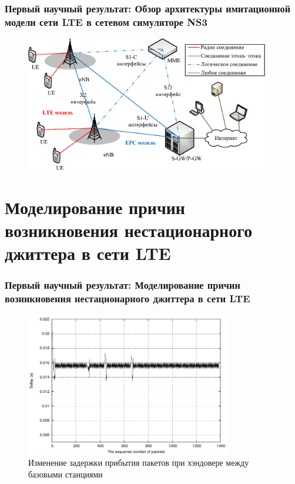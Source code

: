 \documentclass[10pt,pdf,hyperref={unicode}]{beamer}
\begin{document}
\begin{frame}
\frametitle{Первый научный результат: Обзор архитектуры имитационной модели сети LTE в сетевом симуляторе NS3}
\begin{figure} [h]
  \center
\includegraphics [width=0.95\textwidth] {LTEEPC.eps}
\end{figure}



\end{frame}



\section{Моделирование причин возникновения нестационарного джиттера в сети LTE}
\begin{frame}
\frametitle{Первый научный результат: Моделирование причин возникновения нестационарного джиттера в сети LTE}
\begin{figure} [h]
  \center
\includegraphics [width=0.80\textwidth] {hand-eps-converted-to.pdf}
\caption*{Изменение задержки прибытия пакетов при хэндовере между базовыми станциями}
\end{figure}
\end{frame}
\end{document}
